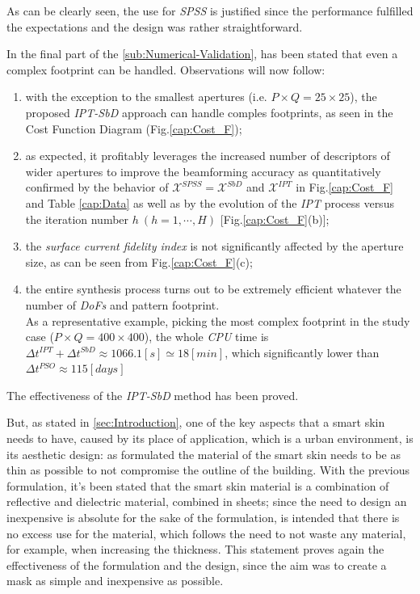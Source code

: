 As can be clearly seen, the use for \emph{SPSS} is justified since
the performance fulfilled the expectations and the design was rather
straightforward.

In the final part of the \ref{sub:Numerical-Validation}, has been
stated that even a complex footprint can be handled. Observations
will now follow:

\begin{enumerate}
\item with the exception to the smallest apertures (i.e. $P\times Q=25\times25$),
the proposed \emph{IPT-SbD} approach can handle comples footprints,
as seen in the Cost Function Diagram (Fig.\ref{cap:Cost_F});
\item as expected, it profitably leverages the increased number of descriptors
of wider apertures to improve the beamforming accuracy as quantitatively
confirmed by the behavior of $\mathcal{X}^{SPSS}=\mathcal{X}^{SbD}$
and $\mathcal{X}^{IPT}$ in Fig.\ref{cap:Cost_F} and Table \ref{cap:Data}
as well as by the evolution of the \emph{IPT} process versus the iteration
number $h\:(h=1,\cdots,H)$ {[}Fig.\ref{cap:Cost_F}(b){]};
\item the \emph{surface current fidelity index} is not significantly affected
by the aperture size, as can be seen from Fig.\ref{cap:Cost_F}(c);
\item the entire synthesis process turns out to be extremely efficient whatever
the number of \emph{DoFs} and pattern footprint. \\
As a representative example, picking the most complex footprint in
the study case ($P\times Q=400\times400$), the whole \emph{CPU} time
is $\Delta t^{IPT}+\Delta t^{SbD}\approx1066.1[s]\simeq18[min]$,
which significantly lower than $\Delta t^{PSO}\approx115[days]$
\end{enumerate}
The effectiveness of the \emph{IPT-SbD} method has been proved.

But, as stated in \ref{sec:Introduction}, one of the key aspects
that a smart skin needs to have, caused by its place of application,
which is a urban environment, is its aesthetic design: as formulated
the material of the smart skin needs to be as thin as possible to
not compromise the outline of the building. With the previous formulation,
it's been stated that the smart skin material is a combination of
reflective and dielectric material, combined in sheets; since the
need to design an inexpensive is absolute for the sake of the formulation,
is intended that there is no excess use for the material, which follows
the need to not waste any material, for example, when increasing the
thickness. This statement proves again the effectiveness of the formulation
and the design, since the aim was to create a mask as simple and inexpensive
as possible. 

